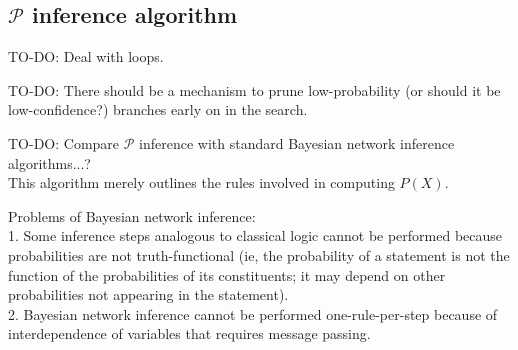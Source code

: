 \documentclass[a4paper]{report}
\begin{document}
\subsection{$\mathcal{P}$ inference algorithm}
\label{sec:P-inference}

%
%
%
%

TO-DO: Deal with loops.

TO-DO: There should be a mechanism to prune low-probability (or should it be low-confidence?) branches early on in the search.

TO-DO: Compare $\mathcal{P}$ inference with standard Bayesian network inference algorithms...?\\
This algorithm merely outlines the rules involved in computing $P(X)$.

Problems of Bayesian network inference:\\
1.  Some inference steps analogous to classical logic cannot be performed because probabilities are not truth-functional (ie, the probability of a statement is not the function of the probabilities of its constituents; it may depend on other probabilities not appearing in the statement).\\
2.  Bayesian network inference cannot be performed one-rule-per-step because of interdependence of variables that requires message passing.
\end{document}
